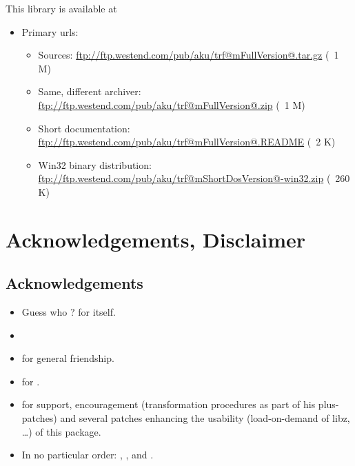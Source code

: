 \documentclass {report}
\begin{document}
This library is available at
\begin {itemize}
\item[] Primary urls:
\begin {itemize}
\item[Sources:]			  \url {ftp://ftp.westend.com/pub/aku/trf@mFullVersion@.tar.gz} (~1 M)
\item[Same, different archiver:]  \url {ftp://ftp.westend.com/pub/aku/trf@mFullVersion@.zip}    (~1 M)
\item[Short documentation:]	  \url {ftp://ftp.westend.com/pub/aku/trf@mFullVersion@.README} (~2 K)
\item[Win32 binary distribution:] \url {ftp://ftp.westend.com/pub/aku/trf@mShortDosVersion@-win32.zip} (~260 K)
\end {itemize}

\end {itemize}


\chapter {Acknowledgements, Disclaimer}

\section {Acknowledgements}
\begin {itemize}\Large
\item	Guess who ? \jo{} for \tcl {} itself. 
\item	\jyl
\item	\bast{} for general friendship.
\item	\greyham{} for .
\item	\jan{} for support, encouragement
	(transformation procedures as part of his plus-patches) and
	several patches enhancing the usability (load-on-demand of
	libz, \dots{}) of this package.
\item	In no particular order: \gookkimn{}, \rvaldez{}, \gvvaughan{}
	and \fmeyer{}.
\end   {itemize}
\end{document}
